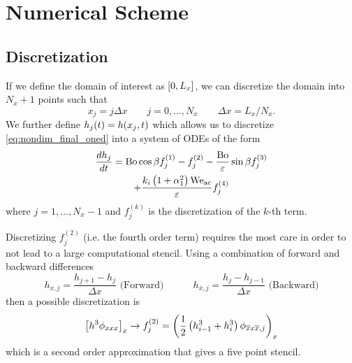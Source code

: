 \section{Numerical Scheme}
\subsection{Discretization}
\begin{frame}
    If we define the domain of interest as $\left[ 0, L_x \right]$, we can discretize the 
    domain into $N_x + 1$ points such that
    \begin{equation*}
        x_j = j\Delta x \quad \quad j = 0, \ldots, N_x \quad \quad \Delta x = L_x / N_x. 
    \end{equation*}
    We further define $h_j\!\left( t \right) = h\!\left( x_j, t \right)$ which allows us to discretize 
    \cref{eq:nondim_final_oned} into a system of ODEs of the form 
    \begin{multline}
        \frac{d h_j}{d t} = \mathrm{Bo}\cos \beta f_j^{(1)} - f_j^{(2)} -  \frac{\mathrm{Bo}}{\varepsilon} \sin \beta f_j^{(3)} 
        \\ + \frac{k_i \left( 1 + \alpha_1^2 \right) \mathrm{We_{ac}}}{\varepsilon} f_j^{(4)}
        \label{eq:ode_sys}
    \end{multline}
    where $j = 1, \ldots, N_x - 1$ and $f_j^{(k)}$ is the discretization of the $k$-th term. 
\end{frame}
\begin{frame}
    Discretizing $f_j^{(2)}$ (i.e. the fourth order term) requires the most care 
    in order to not lead to a large computational stencil. Using a combination of forward
    and backward differences
    \begin{equation*}
        h_{x, j} = \frac{h_{j+1} - h_j}{\Delta x} \text{ (Forward)} \quad \quad \quad h_{\overline{x}, j} = \frac{h_{j} - h_{j-1}}{\Delta x} \text{ (Backward)}
    \end{equation*}
    then a possible discretization is 
    \begin{equation*}
        \left[ h^3\phi_{xxx} \right]_x \rightarrow f_j^{\left( 2 \right)} = \left( \frac{1}{2}\left( h_{i-1}^3 + h_i^3 \right) \phi_{\overline{x}x\overline{x}, j} \right)_{x}
    \end{equation*}
    which is a second order approximation that gives a five point stencil. 
\end{frame}
